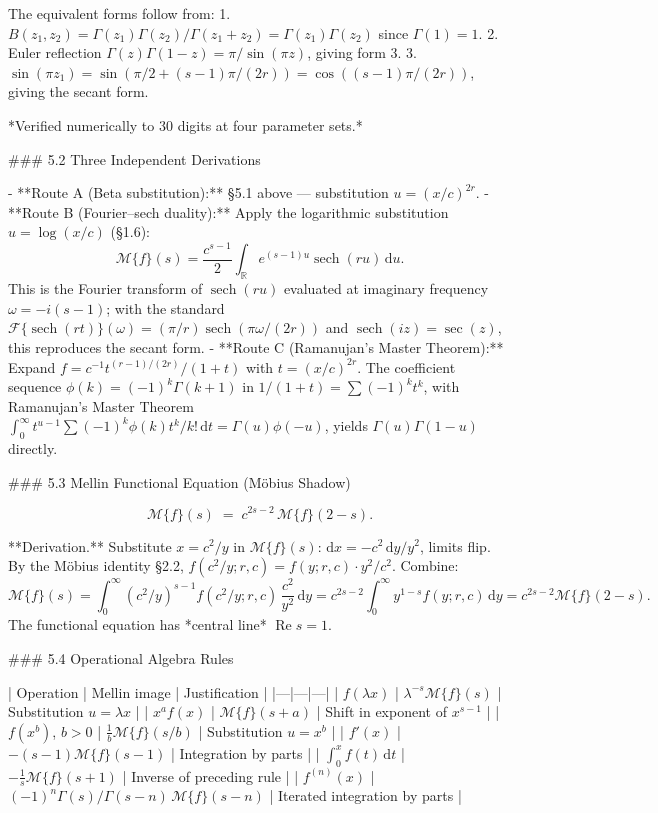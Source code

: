 The equivalent forms follow from:
1. $B(z_{1},z_{2}) = \Gamma(z_{1})\Gamma(z_{2})/\Gamma(z_{1}+z_{2}) = \Gamma(z_{1})\Gamma(z_{2})$ since $\Gamma(1)=1$.
2. Euler reflection $\Gamma(z)\Gamma(1-z) = \pi/\sin(\pi z)$, giving form 3.
3. $\sin(\pi z_{1}) = \sin(\pi/2 + (s-1)\pi/(2r)) = \cos((s-1)\pi/(2r))$, giving the secant form.

*Verified numerically to 30 digits at four parameter sets.*

### 5.2 Three Independent Derivations

- **Route A (Beta substitution):** §5.1 above — substitution $u=(x/c)^{2r}$.
- **Route B (Fourier–sech duality):** Apply the logarithmic substitution $u=\log(x/c)$ (§1.6):
$$
\mathcal M\{f\}(s) = \frac{c^{s-1}}{2}\int_{\mathbb R}e^{(s-1)u}\operatorname{sech}(ru)\,\mathrm du.
$$
This is the Fourier transform of $\operatorname{sech}(ru)$ evaluated at imaginary frequency $\omega = -i(s-1)$; with the standard $\mathcal F\{\operatorname{sech}(rt)\}(\omega) = (\pi/r)\operatorname{sech}(\pi\omega/(2r))$ and $\operatorname{sech}(iz)=\sec(z)$, this reproduces the secant form.
- **Route C (Ramanujan's Master Theorem):** Expand $f = c^{-1}t^{(r-1)/(2r)}/(1+t)$ with $t = (x/c)^{2r}$. The coefficient sequence $\phi(k) = (-1)^{k}\Gamma(k+1)$ in $1/(1+t)=\sum(-1)^{k}t^{k}$, with Ramanujan's Master Theorem $\int_{0}^{\infty}t^{u-1}\sum(-1)^{k}\phi(k)t^{k}/k!\,\mathrm dt = \Gamma(u)\phi(-u)$, yields $\Gamma(u)\Gamma(1-u)$ directly.

### 5.3 Mellin Functional Equation (Möbius Shadow)

$$
\mathcal M\{f\}(s) \;=\; c^{2s-2}\,\mathcal M\{f\}(2-s).
$$

**Derivation.** Substitute $x = c^{2}/y$ in $\mathcal M\{f\}(s)$: $\mathrm dx = -c^{2}\,\mathrm dy/y^{2}$, limits flip. By the Möbius identity §2.2, $f(c^{2}/y;r,c) = f(y;r,c)\cdot y^{2}/c^{2}$. Combine:
$$
\mathcal M\{f\}(s) = \int_{0}^{\infty}(c^{2}/y)^{s-1}f(c^{2}/y;r,c)\,\frac{c^{2}}{y^{2}}\,\mathrm dy = c^{2s-2}\int_{0}^{\infty}y^{1-s}f(y;r,c)\,\mathrm dy = c^{2s-2}\mathcal M\{f\}(2-s).
$$
The functional equation has *central line* $\operatorname{Re} s = 1$.

### 5.4 Operational Algebra Rules

| Operation | Mellin image | Justification |
|---|---|---|
| $f(\lambda x)$ | $\lambda^{-s}\mathcal M\{f\}(s)$ | Substitution $u = \lambda x$ |
| $x^{a}f(x)$ | $\mathcal M\{f\}(s+a)$ | Shift in exponent of $x^{s-1}$ |
| $f(x^{b})$, $b>0$ | $\tfrac{1}{b}\mathcal M\{f\}(s/b)$ | Substitution $u = x^{b}$ |
| $f'(x)$ | $-(s-1)\mathcal M\{f\}(s-1)$ | Integration by parts |
| $\int_{0}^{x}f(t)\,\mathrm dt$ | $-\tfrac{1}{s}\mathcal M\{f\}(s+1)$ | Inverse of preceding rule |
| $f^{(n)}(x)$ | $(-1)^{n}\Gamma(s)/\Gamma(s-n)\,\mathcal M\{f\}(s-n)$ | Iterated integration by parts |

